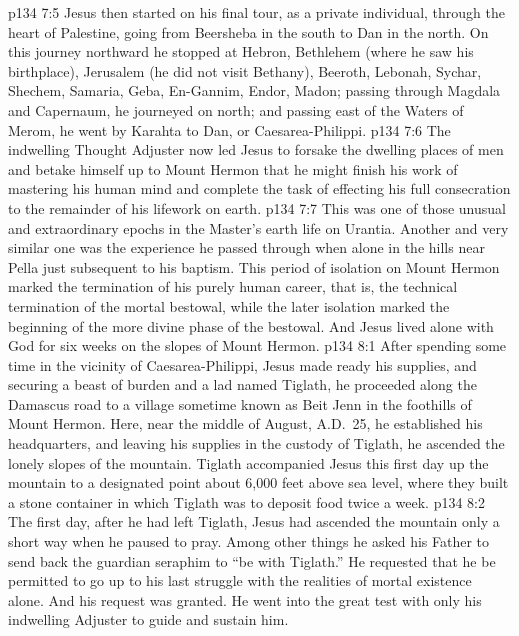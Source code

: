 \vs p134 7:5 Jesus then started on his final tour, as a private individual, through the heart of Palestine, going from Beersheba in the south to Dan in the north. On this journey northward he stopped at Hebron, Bethlehem (where he saw his birthplace), Jerusalem (he did not visit Bethany), Beeroth, Lebonah, Sychar, Shechem, Samaria, Geba, En\hyp{}Gannim, Endor, Madon; passing through Magdala and Capernaum, he journeyed on north; and passing east of the Waters of Merom, he went by Karahta to Dan, or Caesarea\hyp{}Philippi.
\vs p134 7:6 The indwelling Thought Adjuster now led Jesus to forsake the dwelling places of men and betake himself up to Mount Hermon that he might finish his work of mastering his human mind and complete the task of effecting his full consecration to the remainder of his lifework on earth.
\vs p134 7:7 This was one of those unusual and extraordinary epochs in the Master’s earth life on Urantia. Another and very similar one was the experience he passed through when alone in the hills near Pella just subsequent to his baptism. This period of isolation on Mount Hermon marked the termination of his purely human career, that is, the technical termination of the mortal bestowal, while the later isolation marked the beginning of the more divine phase of the bestowal. And Jesus lived alone with God for six weeks on the slopes of Mount Hermon.
\vs p134 8:1 After spending some time in the vicinity of Caesarea\hyp{}Philippi, Jesus made ready his supplies, and securing a beast of burden and a lad named Tiglath, he proceeded along the Damascus road to a village sometime known as Beit Jenn in the foothills of Mount Hermon. Here, near the middle of August, A.D.~25, he established his headquarters, and leaving his supplies in the custody of Tiglath, he ascended the lonely slopes of the mountain. Tiglath accompanied Jesus this first day up the mountain to a designated point about 6,000 feet above sea level, where they built a stone container in which Tiglath was to deposit food twice a week.
\vs p134 8:2 The first day, after he had left Tiglath, Jesus had ascended the mountain only a short way when he paused to pray. Among other things he asked his Father to send back the guardian seraphim to \textcolor{ubdarkred}{“be with Tiglath.”} He requested that he be permitted to go up to his last struggle with the realities of mortal existence alone. And his request was granted. He went into the great test with only his indwelling Adjuster to guide and sustain him.\plusone
